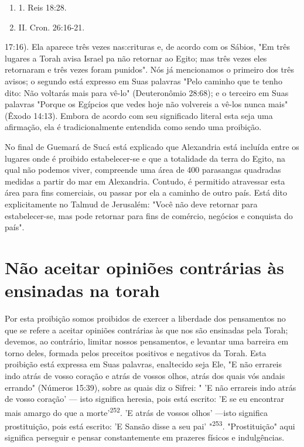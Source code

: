 \begin{itemize}
\begin{enumrate}
\begin{itemize}
\begin{itemize}
\begin{itemize}
\begin{enumerate}
\def\labelenumi{\arabic{enumi}.}
\setcounter{enumi}{249}
\item
 
 1. Reis 18:28.
 
\item
 
 II. Cron. 26:16-21.
 
\end{enumerate}


17:16). Ela aparece três vezes nas:crituras e, de acordo com os Sábios,
"Em três lugares a Torah avisa Israel pa não retornar ao Egito; mas três
vezes eles retornaram e três vezes foram punidos". Nós já mencionamos o
primeiro dos três avisos; o segundo está expresso em Suas palavras "Pelo
caminho que te tenho dito: Não voltarás mais para vê-lo" (Deuteronômio
28:68); e o terceiro em Suas palavras "Porque os Egípcios que vedes hoje
não volvereis a vê-los nunca mais" (Êxodo 14:13). Embora de acordo com
seu significado literal esta seja uma afirmação, ela é tradicionalmente
entendida como sendo uma proibição.

No final de Guemará de Sucá está explicado que Alexandria está in­cluída
entre os lugares onde é proibido estabelecer-se e que a totalidade da
ter­ra do Egito, na qual não podemos viver, compreende uma área de 400
parasan­gas quadradas medidas a partir do mar em Alexandria. Contudo, é
permitido atravessar esta área para fins comerciais, ou passar por ela a
caminho de outro país. Está dito explicitamente no Talmud de Jerusalém:
"Você não deve retor­nar para estabelecer-se, mas pode retornar para
fins de comércio, negócios e conquista do país".

\section{Não aceitar opiniões contrárias às ensinadas na torah}

Por esta proibição somos proibidos de exercer a liberdade dos
pen­samentos no que se refere a aceitar opiniões contrárias às que nos
são ensina­das pela Torah; devemos, ao contrário, limitar nossos
pensamentos, e levantar uma barreira em torno deles, formada pelos
preceitos positivos e negativos da Torah. Esta proibição está expressa
em Suas palavras, enaltecido seja Ele, "E não errareis indo atrás de
vosso coração e atrás de vossos olhos, atrás dos quais vós andais
errando" (Números 15:39), sobre as quais diz o Sifrei: " 'E não
erra­reis indo atrás de vosso coração' --- isto significa heresia, pois
está escrito: 'E se eu encontrar mais amargo do que a
morte'\textsuperscript{252}. 'E atrás de vossos olhos' ---isto significa
prostituição, pois está escrito: 'E Sansão disse a seu pai'
"\textsuperscript{253}. "Prostituição" aqui significa perseguir e pensar
constantemente em prazeres físicos e indulgências.


\end{itemize}
\end{itemize}
\end{itemize}
\end{enumrate}
\end{itemize}
